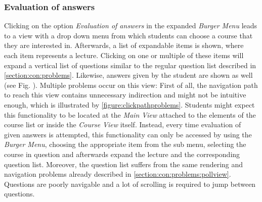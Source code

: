 \subsubsection{Evaluation of answers}

Clicking on the option \emph{Evaluation of answers} in the expanded \emph{Burger Menu} leads to a view with a drop down menu from which students can choose a course that they are interested in. Afterwards, a list of expandable items is shown, where each item represents a lecture. Clicking on one or multiple of these items will expand a vertical list of questions similar to  the regular question list described in \autoref{section:con:problems}. Likewise, answers given by the student are shown as well (see Fig. \todogrf).
Multiple problems occur on this view: First of all, the navigation path to reach this view contains unnecessary indirection and might not be intuitive enough, which is illustrated by \autoref{figure:clickpathproblems}. Students might expect this functionality to be located at the \emph{Main View} attached to the elements of the course list or inside the \emph{Course View} itself. Instead, every time evaluation of given answers is attempted, this functionality can only be accessed by using the \emph{Burger Menu}, choosing the appropriate item from the sub menu, selecting the course in question and afterwards expand the lecture and the corresponding question list.
Moreover, the question list suffers from the same rendering and navigation problems already described in \autoref{section:con:problems:pollview}. Questions are poorly navigable and a lot of scrolling is required to jump between questions.



